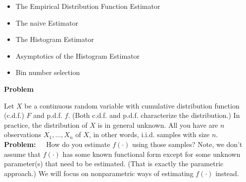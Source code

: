 \documentclass[19pt,landscaoe]{article}
\begin{document}
%


%

\newpage
{}
\vskip25pt
\begin{minipage}{.9\textwidth}
    \Large
\begin{itemize}
\item The Empirical  Distribution Function Estimator
\item The naive Estimator 
\item The Histogram Estimator  
\item Asymptotics of the Histogram Estimator 
\item Bin number selection

\end{itemize}
\end{minipage}
\newpage
{\Large\centerline{\textbf{Problem}}}
\vskip25pt
\begin{minipage}{.9\textwidth}
    \Large
Let $X$ be a continuous random variable with cumulative distribution function (c.d.f.) $F$ and p.d.f. $f$.
(Both c.d.f. and p.d.f. characterize the distribution.)
In practice, the distribution of $X$ is in general unknown. All you have are $n$ observations $X_1,\dots,X_n$ of $X$, in other words, i.i.d. samples with size $n$. 
\vskip 10pt
{\bf Problem:}~~~How do you estimate $f(\cdot)$ using those samples? 
\vskip 5pt
Note, we don't assume that $f(\cdot)$ has some known functional form except for some unknown parameter(s) that need to be estimated. (That is exactly the parametric approach.)
\vskip 5pt
We will focus on nonparametric ways of estimating $f(\cdot)$ instead. 
\end{minipage}
\end{document}
